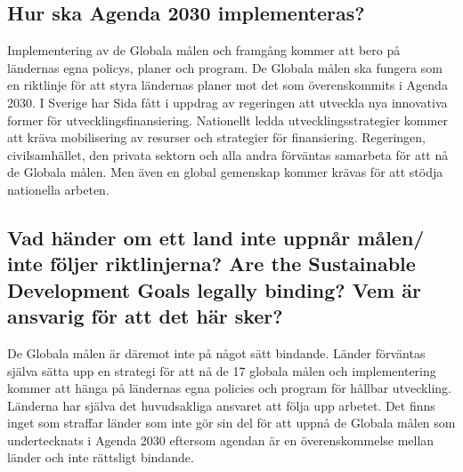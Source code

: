\documentclass{report}
\begin{document}
\subsection{Hur ska Agenda 2030 implementeras?} 
Implementering av de Globala målen och framgång kommer att bero på ländernas egna policys, planer och program. De Globala målen ska fungera som en riktlinje för att styra ländernas planer mot det som överenskommits i Agenda 2030. \cite{web2030agenda}
I Sverige har Sida fått i uppdrag av regeringen att utveckla nya innovativa former för utvecklingsfinansiering. \cite{webSIDA}
Nationellt ledda utvecklingsstrategier kommer att kräva mobilisering av resurser och strategier för finansiering. Regeringen, civilsamhället, den privata sektorn och alla andra förväntas samarbeta för att nå de Globala målen. Men även en global gemenskap kommer krävas för att stödja nationella arbeten.\\

\subsection{Vad händer om ett land inte uppnår målen/ inte följer riktlinjerna? Are the Sustainable Development Goals legally binding? Vem är ansvarig för att det här sker?} 
De Globala målen är däremot inte på något sätt bindande. Länder förväntas själva sätta upp en strategi för att nå de 17 globala målen och implementering kommer att hänga på ländernas egna policies och program för hållbar utveckling. Länderna har själva det huvudsakliga ansvaret att följa upp arbetet. Det finns inget som straffar länder som inte gör sin del för att uppnå de Globala målen som undertecknats i Agenda 2030 eftersom agendan är en överenskommelse mellan länder och inte rättsligt bindande. \cite{web2030agenda}\\
\end{document}

